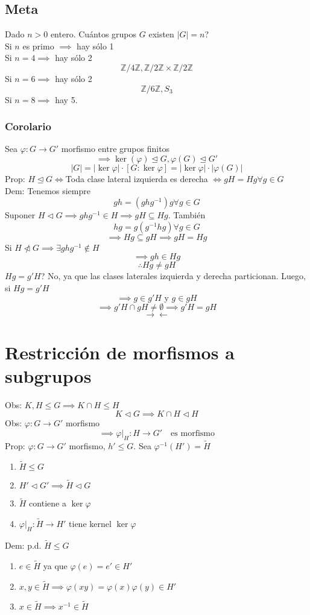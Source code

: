 \documentclass[11pt]{book}
\theoremstyle{definition}
\begin{document}
\subsection{Meta}
Dado $n>0$ entero. Cuántos grupos $G$ existen $|G|=n$?\\
Si $n$ es primo $\implies$ hay sólo 1\\
Si $n=4\implies$ hay sólo 2
\[
\mathbb{Z}/4\mathbb{Z},\mathbb{Z}/2\mathbb{Z}\times\mathbb{Z}/2\mathbb{Z}
\]
Si $n=6\implies$ hay sólo 2
\[
\mathbb{Z}/6\mathbb{Z}, S_3
\]
Si $n=8\implies$ hay 5.

\subsubsection{Corolario}
Sea $\varphi:G\rightarrow G'$ morfismo entre grupos finitos
\[
\implies \ker(\varphi) \unlhd G,\varphi (G) \unlhd G'
\]
\[
|G|=|\ker\varphi|\cdot[G:\ker\varphi]=|\ker\varphi|\cdot |\varphi(G)|
\]
Prop: $H\unlhd G\iff$Toda clase lateral izquierda es derecha $\iff gH=Hg\forall g\in G$\\
Dem: Tenemos siempre
\[
gh=(ghg^{-1})g\forall g\in G
\]
Suponer $H\lhd G\implies ghg^{-1}\in H\implies gH\subseteq Hg$. También
\[
hg=g(g^{-1}hg)\forall g\in G
\]
\[
\implies Hg\subseteq gH\implies gH=Hg
\]
Si $H\ntriangleleft G\implies \exists ghg^{-1}\notin H$
\[
\implies gh\in Hg
\]
\[
\therefore Hg\neq gH
\]
$Hg=g'H$?
No, ya que las clases laterales izquierda y derecha particionan. Luego, si $Hg=g'H$
\[
\implies g\in g'H\textrm{ y }g\in gH
\]
\[
\implies g'H\cap gH\neq\emptyset\implies g'H=gH
\]
\[
\rightarrow\leftarrow
\]
\section{Restricción de morfismos a subgrupos}
Obs: $K,H\leq G\implies K\cap H\leq H$
\[
K\lhd G\implies K\cap H\lhd H
\]
Obs: $\varphi:G\rightarrow G'$ morfismo
\[
\implies \varphi|_H:H\rightarrow G'\quad\textrm{es morfismo}
\]
Prop: $\varphi:G\rightarrow G'$ morfismo, $h'\leq G$. Sea $\varphi^{-1}(H')=\tilde{H}$
\begin{enumerate}[label=(\alph*)]
	\item $\tilde{H}\leq G$
	
	\item $H'\lhd G'\implies \tilde{H}\lhd G$
	
	\item $\tilde{H}$ contiene a $\ker\varphi$
	
	\item $\varphi|_H:\tilde{H}\rightarrow H'$ tiene kernel $\ker\varphi$
\end{enumerate}
Dem: p.d. $\tilde{H}\leq G$
\begin{enumerate}
	\item $e\in\tilde{H}$ ya que $\varphi(e)=e'\in H'$
	
	\item $x,y\in\tilde{H}\implies\varphi(xy)=\varphi(x)\varphi(y)\in H'$
	
	\item $x\in\tilde{H}\implies x^{-1}\in\tilde{H}$
\end{enumerate}
\end{document}
